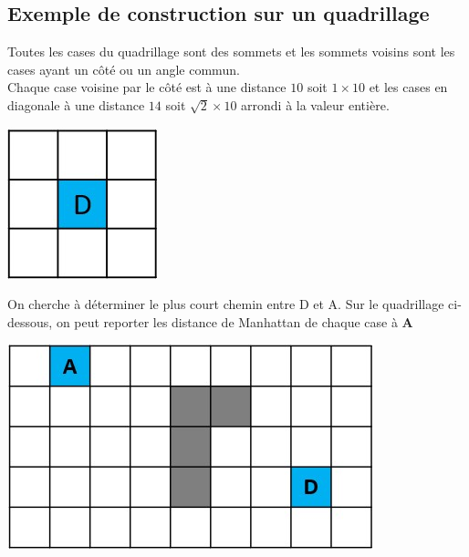 \subsection{Exemple de construction sur un quadrillage}

\begin{minipage}[c]{.6\linewidth}
Toutes les cases du quadrillage sont des sommets et les sommets voisins sont les cases ayant un côté ou un angle commun.\\
Chaque case voisine par le côté est à une distance $10$ soit $1 \times 10$ et les cases en diagonale à une distance $14$ soit $\sqrt{2} \times 10$ arrondi à la valeur entière.\\
\end{minipage}
\hfill %
\begin{minipage}[c]{.35\linewidth}
\begin{center}
\includegraphics[scale=0.7]{images/quadri1.jpg}
\end{center}
\end{minipage}


On cherche à déterminer le plus court chemin entre D et A. Sur le quadrillage ci-dessous, on peut reporter les distance de Manhattan de chaque case à \textbf{A}
\begin{center}
\includegraphics[scale=0.8]{images/quadri2.jpg}
\end{center}

